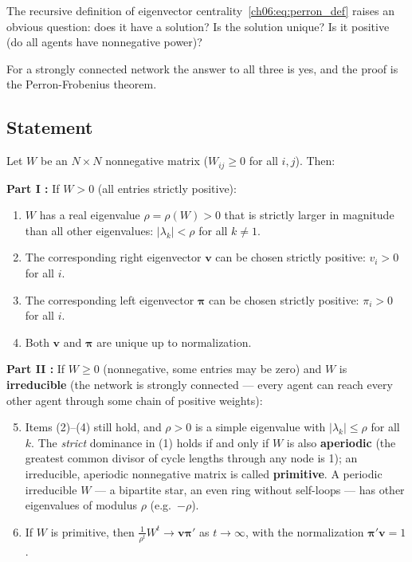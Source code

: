 \documentclass[../structural_economics_book.tex]{subfiles}
\begin{document}
The recursive definition of eigenvector centrality~\eqref{ch06:eq:perron_def} raises an obvious question: does it have a solution? Is the solution unique? Is it positive (do all agents have nonnegative power)?

For a strongly connected network the answer to all three is yes, and the proof is the Perron-Frobenius theorem.

\subsection{Statement}

\begin{theorem}\label{ch06:thm:PF}
Let $W$ be an $N \times N$ nonnegative matrix ($W_{ij} \geq 0$ for all $i, j$). Then:

\textbf{Part I \citep{perron1907theorie}:} If $W > 0$ (all entries strictly positive):
\begin{enumerate}
\item $W$ has a real eigenvalue $\rho = \rho(W) > 0$ that is strictly larger in magnitude than all other eigenvalues: $|\lambda_k| < \rho$ for all $k \neq 1$.
\item The corresponding right eigenvector $\mathbf{v}$ can be chosen strictly positive: $v_i > 0$ for all $i$.
\item The corresponding left eigenvector $\boldsymbol{\pi}$ can be chosen strictly positive: $\pi_i > 0$ for all $i$.
\item Both $\mathbf{v}$ and $\boldsymbol{\pi}$ are unique up to normalization.
\end{enumerate}

\textbf{Part II \citep{frobenius1912matrizen}:} If $W \geq 0$ (nonnegative, some entries may be zero) and $W$ is \textbf{irreducible} (the network is strongly connected --- every agent can reach every other agent through some chain of positive weights):
\begin{enumerate}
\setcounter{enumi}{4}
\item Items (2)--(4) still hold, and $\rho > 0$ is a simple eigenvalue with $|\lambda_k| \leq \rho$ for all $k$. The \textit{strict} dominance in (1) holds if and only if $W$ is also \textbf{aperiodic} (the greatest common divisor of cycle lengths through any node is 1); an irreducible, aperiodic nonnegative matrix is called \textbf{primitive}. A periodic irreducible $W$ --- a bipartite star, an even ring without self-loops --- has other eigenvalues of modulus $\rho$ (e.g.\ $-\rho$).
\item If $W$ is primitive, then $\frac{1}{\rho^t}W^t \to \mathbf{v}\boldsymbol{\pi}'$ as $t \to \infty$, with the normalization $\boldsymbol{\pi}'\mathbf{v} = 1$.
\end{enumerate}
\end{theorem}
\end{document}
